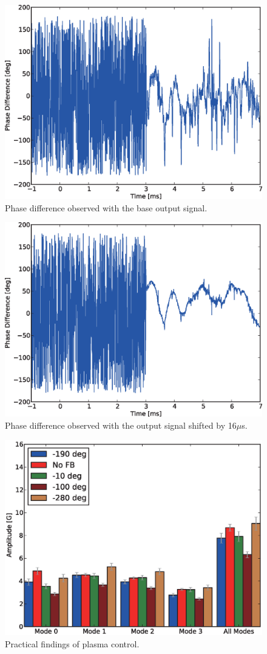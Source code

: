 \begin{figure}[t]
 \centering
 \includegraphics[width=0.7\hsize]{eps/75221_base.eps}
 \caption{Phase difference observed with the base output signal.}
 \label{fig:phase_base}
\end{figure}
\begin{figure}[t]
 \centering
 \includegraphics[width=0.7\hsize]{eps/75221_shifted.eps}
 \caption{Phase difference observed with the output signal shifted by 16$\mu$s.}
 \label{fig:phase_shifted}
\end{figure}

\begin{figure}[t]
 \centering
 \includegraphics[width=0.9\hsize]{eps/overview.eps}
 \caption{Practical findings of plasma control.}
 \label{fig:plasma_overview}
\end{figure}

